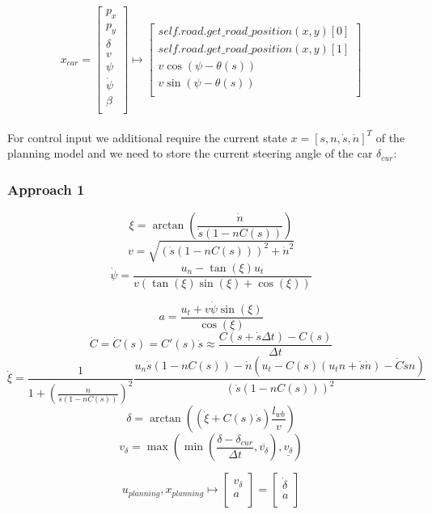 \[
	x_{car} = \begin{bmatrix}
		p_x        \\
		p_y        \\
		\delta     \\
		v          \\
		\psi       \\
		\dot{\psi} \\
		\beta      \\
	\end{bmatrix} \mapsto \begin{bmatrix}
		self.road.get\_road\_position(x, y)[0] \\
		self.road.get\_road\_position(x, y)[1] \\
		v \cos(\psi - \theta(s))               \\
		v \sin(\psi - \theta(s))               \\
	\end{bmatrix}
\]
\\
For control input we additional require the current state $x = [s, n, \dot{s}, \dot{n}]^T$ of the planning model and we need to store the current steering angle of the car $\delta_{cur}$:

\subsubsection{Approach 1}

\[
	\xi = \arctan(\frac{\dot{n}}{\dot{s} (1 - n C(s))})
\]
\[
	v = \sqrt{(\dot{s} (1 - n C(s)))^2 + \dot{n}^2}
\]
\[
	\dot{\psi} = \frac{u_n - \tan(\xi) u_t}{v (\tan(\xi) \sin(\xi) + \cos(\xi))}
\]

\[
	a = \frac{u_t + v \dot{\psi} \sin(\xi)}{\cos(\xi)}
\]
\[
	\dot{C} = \dot{C}(s) = C'(s)\dot{s} \approx \frac{C(s + \dot{s} \Delta t) - C(s)}{\Delta t}
\]
\[
	\dot{\xi} = \frac{1}{1 + (\frac{\dot{n}}{\dot{s} (1 - n C(s))})^2} \frac{u_n \dot{s} (1 - n C(s)) - \dot{n} (u_t - C(s) (u_t n + \dot{s} \dot{n}) - \dot{C} \dot{s} n)}{(\dot{s} (1 - n C(s)))^2}
\]
\[
	\delta = \arctan((\dot{\xi} + C(s) \dot{s}) \frac{l_{wb}}{v})
\]
\[
	v_\delta = \max(\min(\frac{\delta - \delta_{cur}}{\Delta t}, \overline{v_\delta}), \underline{v_\delta})
\]

\[
	u_{planning}, x_{planning} \mapsto \begin{bmatrix}
		v_\delta \\
		a        \\
	\end{bmatrix} = \begin{bmatrix}
		\dot{\delta} \\
		a            \\
	\end{bmatrix}
\]

